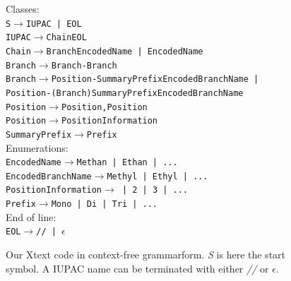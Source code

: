 \documentclass[
fontsize=11pt,
paper=a4,
abstract=true,
numbers=noenddot,
listof=totoc,
bibliography=totoc,
twoside,
open=right,
cleardoublepage=plain,
parskip=half+, %
BCOR=1cm, %
]{scrreprt}
\newcommand{\CFG}{context-free grammar}
\begin{document}
\begin{figure}[H]
\noindent Classes:\\ 
\texttt{\phantom{XXXX}S$\rightarrow$\space IUPAC | EOL}\\
\texttt{\phantom{XXXX}IUPAC$\rightarrow$\space ChainEOL}\\
\texttt{\phantom{XXXX}Chain$\rightarrow$\space BranchEncodedName | EncodedName}\\
\texttt{\phantom{XXXX}Branch$\rightarrow$\space Branch-Branch}\\
\texttt{\phantom{XXXX}Branch$\rightarrow$\space Position-SummaryPrefixEncodedBranchName |} 
\texttt{\phantom{xxxxxxxxxxxxxxxxxxxxxxxxxxxxx}Position-(Branch)SummaryPrefixEncodedBranchName}\\
\texttt{\phantom{XXXX}Position$\rightarrow$\space Position,Position}\\
\texttt{\phantom{XXXX}Position$\rightarrow$\space PositionInformation}\\
\texttt{\phantom{XXXX}SummaryPrefix$\rightarrow$\space Prefix}\\


\noindent Enumerations:\\
\texttt{\phantom{XXXX}EncodedName$\rightarrow$\space Methan | Ethan | ...}\\
\texttt{\phantom{XXXX}EncodedBranchName$\rightarrow$\space Methyl | Ethyl | ...}\\
\texttt{\phantom{XXXX}PositionInformation$\rightarrow$ | 2 | 3 | ...}\\
\texttt{\phantom{XXXX}Prefix$\rightarrow$\space Mono | Di | Tri | ...}\\


\noindent End of line:\\
\texttt{\phantom{XXXX}EOL$\rightarrow$\space // | 
$\epsilon$}
    \caption{Our Xtext code in \CFG \space form. \emph{S} is here the start symbol. A IUPAC name can be terminated with either \emph{//} or $\epsilon$.}
    \label{fig:CFGinXtext}
\end{figure}
\end{document}
